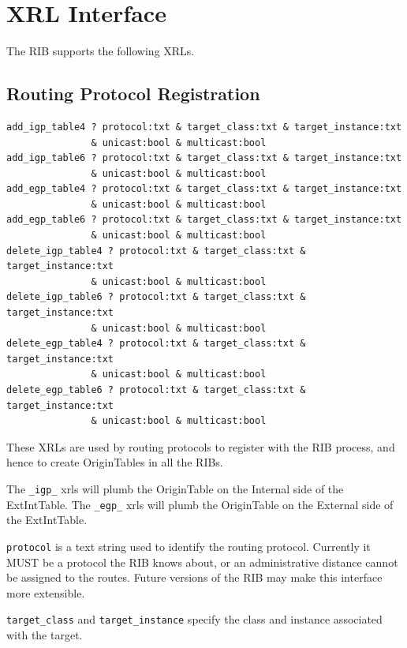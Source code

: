 \documentclass[11pt]{article}
\begin{document}
\section{XRL Interface}

The RIB supports the following XRLs.

\subsection{Routing Protocol Registration}

\begin{verbatim}
add_igp_table4 ? protocol:txt & target_class:txt & target_instance:txt
               & unicast:bool & multicast:bool
add_igp_table6 ? protocol:txt & target_class:txt & target_instance:txt
               & unicast:bool & multicast:bool
add_egp_table4 ? protocol:txt & target_class:txt & target_instance:txt
               & unicast:bool & multicast:bool
add_egp_table6 ? protocol:txt & target_class:txt & target_instance:txt
               & unicast:bool & multicast:bool
delete_igp_table4 ? protocol:txt & target_class:txt & target_instance:txt
               & unicast:bool & multicast:bool
delete_igp_table6 ? protocol:txt & target_class:txt & target_instance:txt
               & unicast:bool & multicast:bool
delete_egp_table4 ? protocol:txt & target_class:txt & target_instance:txt
               & unicast:bool & multicast:bool
delete_egp_table6 ? protocol:txt & target_class:txt & target_instance:txt
               & unicast:bool & multicast:bool
\end{verbatim}

These XRLs are used by routing protocols to register with the RIB
process, and hence to create OriginTables in all the RIBs.

The {\tt \_igp\_} xrls will plumb the OriginTable on the Internal side
of the ExtIntTable.  The {\tt \_egp\_} xrls will plumb the OriginTable
on the External side of the ExtIntTable.

{\tt protocol} is a text string used to identify the routing protocol.
Currently it MUST be a protocol the RIB knows about, or an
administrative distance cannot be assigned to the routes.  Future
versions of the RIB may make this interface more extensible.

{\tt target\_class} and {\tt target\_instance} specify the
class and instance associated with the target.
\end{document}
